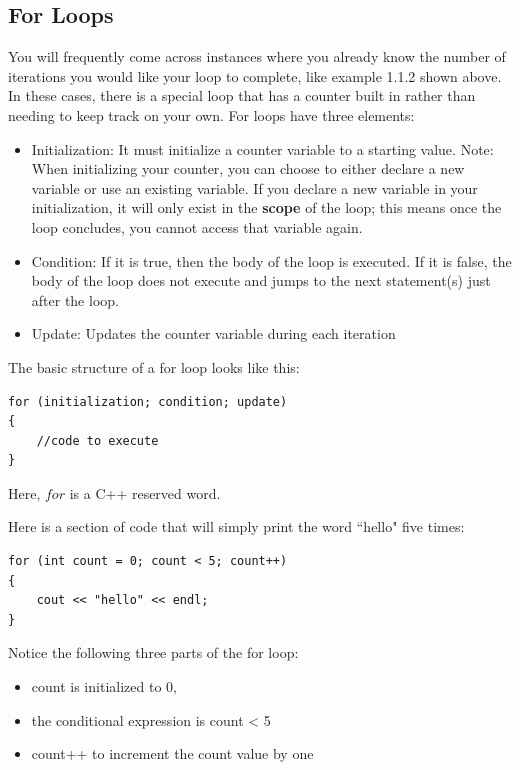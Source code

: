 \subsection{For Loops}
You will frequently come across instances where you already know the number of iterations you would like your loop to complete, like example 1.1.2 shown above. In these cases, there is a special loop that has a counter built in rather than needing to keep track on your own. For loops have three elements:
\begin{itemize}
    \item Initialization: It must initialize a counter variable to a starting value. Note: When initializing your counter, you can choose to either declare a new variable or use an existing variable. If you declare a new variable in your initialization, it will only exist in the \textbf{scope} of the loop; this means once the loop concludes, you cannot access that variable again. 
    \item Condition: If it is true, then the body of the loop is executed. If it is false, the body of the loop does not execute and jumps to the next statement(s) just after the loop.
    \item Update: Updates the counter variable during each iteration
\end{itemize}

The basic structure of a for loop looks like this:

\begin{verbatim}
for (initialization; condition; update)
{
    //code to execute
}
\end{verbatim}

Here, $for$ is a C++ reserved word. 

\begin{example}
    Here is a section of code that will simply print the word ``hello" five times:
    \begin{verbatim}
for (int count = 0; count < 5; count++)
{
    cout << "hello" << endl;
}
    \end{verbatim}
    Notice the following three parts of the for loop:

    \begin{itemize}
        \item count is initialized to 0,
        \item the conditional expression is count < 5
        \item count++ to increment the count value by one
    \end{itemize}

\end{example}

